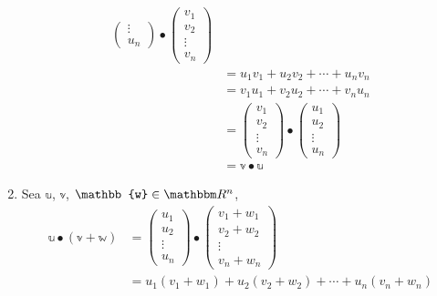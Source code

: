 \begin{proposition}
\begin{enumerate}[label=\roman*)]
\begin{align*}
\begin{pmatrix}
                \vdots \\
                u_n
            \end{pmatrix} \bullet \begin{pmatrix}
                v_1 \\
                v_2 \\
                \vdots \\
                v_n
            \end{pmatrix} \\
            & = u_1v_1 + u_2v_2 + \cdots + u_nv_n \\
            & = v_1u_1 + v_2u_2 + \cdots + v_nu_n \\
            & = \begin{pmatrix}
                v_1 \\
                v_2 \\
                \vdots \\
                v_n
            \end{pmatrix} \bullet \begin{pmatrix}
                u_1 \\
                u_2 \\
                \vdots \\
                u_n
            \end{pmatrix} \\
            & = \mathbb{v} \bullet \mathbb{u}
        \end{align*}
        \item Sea $\mathbb{u}$, $\mathbb{v}$, $\mathbb{w} \in \RR[n]$,
        \begin{align*}
            \mathbb{u} \bullet (\mathbb{v} + \mathbb{w}) & = \begin{pmatrix}
                u_1 \\
                u_2 \\
                \vdots \\
                u_n
            \end{pmatrix} \bullet \begin{pmatrix}
                v_1+w_1 \\
                v_2+w_2 \\
                \vdots \\
                v_n+w_n
            \end{pmatrix} \\
            & = u_1(v_1+w_1) + u_2(v_2+w_2) + \cdots + u_n(v_n+w_n) \\

\end{align*}
\end{enumerate}
\end{proposition}
